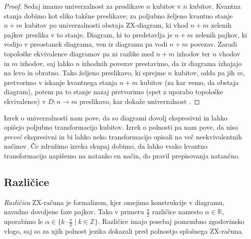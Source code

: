 \documentclass[mat1]{fmfdelo}
\newcommand{\R}{\mathbb R}
\newcommand{\Z}{\mathbb Z}
\begin{document}
\begin{proof}
Sedaj imamo univerzalnost za preslikave \(n\) kubitov v \(n\) kubitov. Kvantna stanja dobimo kot sliko takšne preslikave; za poljubno željeno kvantno stanje \(n+m\) kubitov po univerzalnosti obstaja ZX-diagram, ki vhod \(n+m\) zelenih pajkov preslika v to stanje. Diagram, ki to predstavlja je \(n+m\) zelenih pajkov, ki vodijo v preostanek diagrama, ven iz diagrama pa vodi \(n+m\) povezav. Zaradi topološke ekvivalence diagramov pa ni razlike med \(n+m\) izhodov ter \(n\) vhodov in \(m\) izhodov, saj lahko \(n\) izhodnih povezav prestavimo, da iz diagrama izhajajo na levo in obratno. Tako željeno preslikavo, ki sprejme \(n\) kubitov, odda pa jih \(m\), pretvorimo v iskanje kvantnega stanja \(n+m\) kubitov (za kar vemo, da obstaja diagram), potem pa to stanje nazaj pretvorimo (spet z uporabo topološke ekvivalence) v \(D:n\to m\) preslikavo, kar dokaže univerzalnost \cite[Izrek 2.18]{Coecke_2011}. \end{proof}

Izrek o univerzalnosti nam pove, da so diagrami dovolj ekspresivni in lahko opišejo poljubno transformacijo kubitov. Izrek o polnosti pa nam pove, da niso \emph{preveč} ekspresivni in bi lahko neko transformacijo opisali na več neekvivalentnih načinov. Če združimo izreka skupaj dobimo, da lahko vsako kvantno transformacijo napišemo na natanko en način, do pravil prepisovanja natančno.

\subsection{Različice}
\emph{Različica} ZX-računa je formalizem, kjer omejimo konstrukcije v diagramu, navadno dovoljene faze pajkov. Tako v primeru \(\frac\pi2\) različice namesto \(\alpha\in \R\), uporabimo le \(\alpha\in\{k\cdot \frac\pi2\mid k\in\Z\}\). Različice imajo posebaj pomembno zgodovinsko vlogo, saj so za njih polnost jezika dokazali pred polnostjo splošnega ZX-računa.
\end{document}
